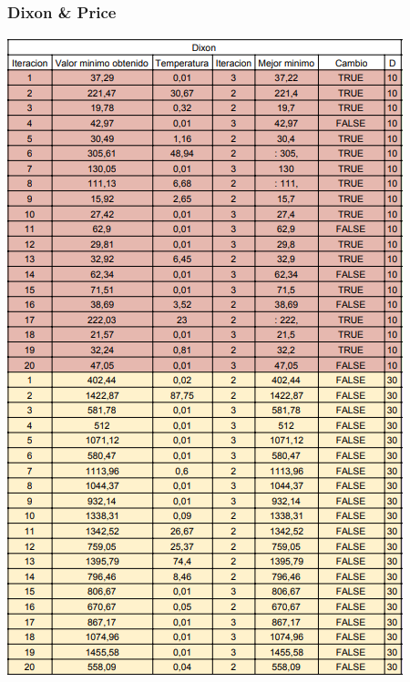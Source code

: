 \documentclass[10pt]{article}
\begin{document}
\subsubsection{Dixon \& Price}
\begin{center}
  \includegraphics[scale=0.5]{imgs/dixon.png}
\end{center}
\end{document}

